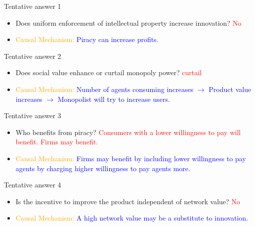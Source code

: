 \documentclass{beamer}
\numberwithin{equation}{section}
\begin{document}
\begin{frame}{Tentative answer 1}
\begin{itemize}
    \item Does uniform enforcement of intellectual property increase innovation? \textcolor{red}{No}
    \item \textcolor{orange}{Causal Mechanism:} \textcolor{blue}{Piracy can increase profits.}
\end{itemize}
\end{frame}
\begin{frame}{Tentative answer 2}
\begin{itemize}
    \item Does social value enhance or curtail monopoly power? \textcolor{red}{curtail}
    \item \textcolor{orange}{Causal Mechanism:} \textcolor{blue}{Number of agents consuming increases $\rightarrow$ Product value increases $\rightarrow$ Monopolist will try to increase users.}
\end{itemize}
\end{frame}
\begin{frame}{Tentative answer 3}
\begin{itemize}
    \item Who benefits from piracy?  \textcolor{red}{Consumers with a lower willingness to pay will benefit. Firms may benefit.}
    \item \textcolor{orange}{Causal Mechanism:} \textcolor{blue}{Firms may benefit by including lower willingness to pay agents by charging higher willingness to pay agents more.}
\end{itemize}
\end{frame}
\begin{frame}{Tentative answer 4}
\begin{itemize}
    \item Is the incentive to improve the product independent of network value? \textcolor{red}{No}
    \item \textcolor{orange}{Causal Mechanism:} \textcolor{blue}{A high network value may be a substitute to innovation.}
\end{itemize}
\end{frame}
\end{document}
